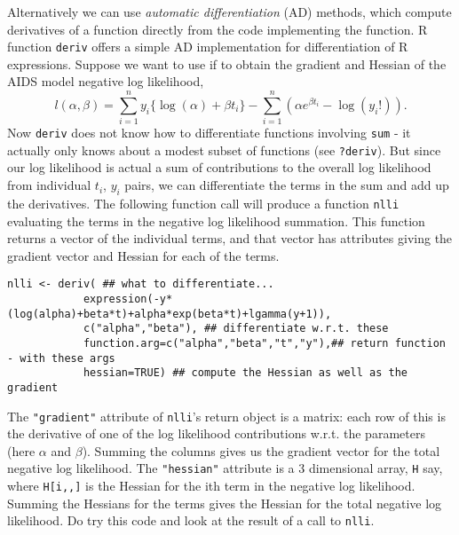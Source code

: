 \documentclass[10pt] {article}
\theoremstyle{definition}
\begin{document}
Alternatively we can use {\em automatic differentiation} (AD) methods, which compute derivatives of a function directly from the code implementing the function. R function {\tt deriv} offers a simple AD implementation for differentiation of R expressions. Suppose we want to use if to obtain the gradient and Hessian of the AIDS model negative log likelihood, 
$$
l(\alpha,\beta) = \sum_{i=1}^n y_i \{\log(\alpha) + \beta t_i\} - \sum_{i=1}^n ( \alpha e^{\beta t_i} - \log (y_i!) ).
$$
Now {\tt deriv} does not know how to differentiate functions involving {\tt sum} - it actually only knows about a modest subset of functions (see {\tt ?deriv}). But since our log likelihood is actual a sum of contributions to the overall log likelihood from individual $t_i$, $y_i$ pairs, we can differentiate the terms in the sum and add up the derivatives. The following function call will produce a function {\tt nlli} evaluating the terms in the negative log likelihood summation. This function returns a vector of the individual terms, and that vector has attributes giving the gradient vector and Hessian for each of the terms.     
\begin{lstlisting}
nlli <- deriv( ## what to differentiate...
            expression(-y*(log(alpha)+beta*t)+alpha*exp(beta*t)+lgamma(y+1)),
            c("alpha","beta"), ## differentiate w.r.t. these
            function.arg=c("alpha","beta","t","y"),## return function - with these args 
            hessian=TRUE) ## compute the Hessian as well as the gradient
\end{lstlisting}
The \lstinline+"gradient"+ attribute of {\tt nlli}'s return object is a matrix: each row of this is the derivative of one of the log likelihood contributions w.r.t. the parameters (here $\alpha$ and $\beta$). Summing the columns gives us the gradient vector for the total negative log likelihood. The \lstinline+"hessian"+ attribute is a 3 dimensional array, {\tt H} say, where 
\lstinline+H[i,,]+ is the Hessian for the ith term in the negative log likelihood. Summing the Hessians for the terms gives the Hessian for the total negative log likelihood. Do try this code and look at the result of a call to {\tt nlli}.
\end{document}
